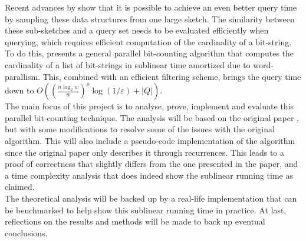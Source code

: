 Recent advances by \citet{fast-similarity-search} show that it is possible to achieve an even better query time by sampling these data structures from one large sketch. The similarity between these sub-sketches and a query set needs to be evaluated efficiently when querying, which requires efficient computation of the cardinality of a bit-string. To do this, \citet{fast-similarity-search} presents a general parallel bit-counting algorithm that computes the cardinality of a list of bit-strings in sublinear time amortized due to word-parallism. This, combined with an efficient filtering scheme, brings the query time down to $O((\frac{n\log_2 w}{w})^\rho \log(1/\varepsilon) + |Q|)$.\\
The main focus of this project is to analyse, prove, implement and evaluate this parallel bit-counting technique. The analysis will be based on the original paper \cite{fast-similarity-search}, but with some modifications to resolve some of the issues with the original algorithm. This will also include a pseudo-code implementation of the algorithm since the original paper only describes it through recurrences. This leads to a proof of correctness that slightly differs from the one presented in the paper, and a time complexity analysis that does indeed show the sublinear running time as claimed.\\
The theoretical analysis will be backed up by a real-life implementation that can be benchmarked to help show this sublinear running time in practice. At last, reflections on the results and methods will be made to back up eventual conclusions.


